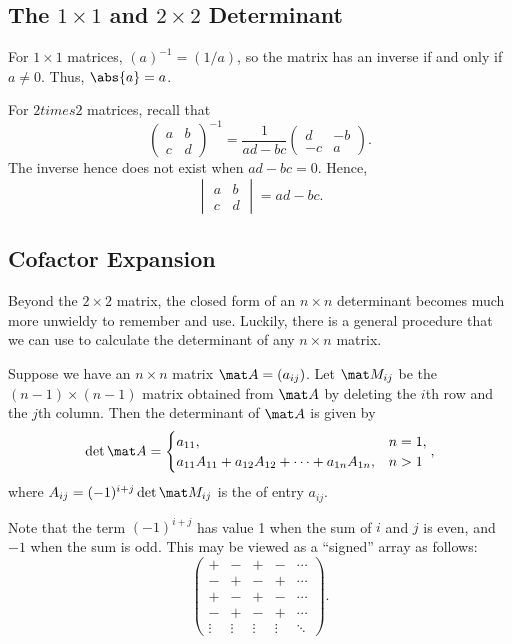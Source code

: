 \subsection{The \texorpdfstring{$1 \times 1$}{1 x 1} and \texorpdfstring{$2 \times 2$}{2 x 2} Determinant}

For $1 \times 1$ matrices, $(a)^{-1} = (1/a)$, so the matrix has an inverse if and only if $a \neq 0$. Thus, $\abs{a} = a$.

For $2 times 2$ matrices, recall that \[\begin{pmatrix}a & b \\ c & d\end{pmatrix}^{-1} = \frac1{ad - bc} \begin{pmatrix}d & -b \\ -c & a\end{pmatrix}.\] The inverse hence does not exist when $ad - bc = 0$. Hence, \[\begin{vmatrix}a & b \\ c& d\end{vmatrix} = ad - bc.\]

\subsection{Cofactor Expansion}

Beyond the $2 \times 2$ matrix, the closed form of an $n \times n$ determinant becomes much more unwieldy to remember and use. Luckily, there is a general procedure that we can use to calculate the determinant of any $n \times n$ matrix.

\begin{proposition}\label{prop:cofactor}
    Suppose we have an $n \times n$ matrix $\mat A = (a_{ij})$. Let $\mat M_{ij}$ be the $(n-1) \times (n-1)$ matrix obtained from $\mat A$ by deleting the $i$th row and the $j$th column. Then the determinant of $\mat A$ is given by \[\det{\mat A} = \begin{cases}
        a_{11}, & n = 1,\\
        a_{11} A_{11} + a_{12} A_{12} + \dots + a_{1n} A_{1n}, & n > 1
    \end{cases},\] where $A_{ij} = (-1)^{i+j} \det{\mat M_{ij}}$ is the  of entry $a_{ij}$.
\end{proposition}

Note that the term $(-1)^{i+j}$ has value 1 when the sum of $i$ and $j$ is even, and $-1$ when the sum is odd. This may be viewed as a ``signed'' array as follows: \[\begin{pmatrix}+ & - & + & - & \cdots \\ - & + & - & + & \cdots \\ + & - & + & - & \cdots \\ - & + & - & + & \cdots \\ \vdots & \vdots & \vdots & \vdots & \ddots \end{pmatrix}.\]

